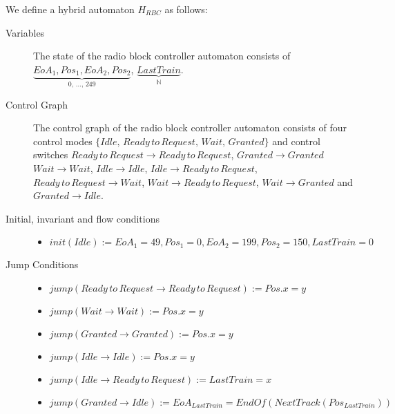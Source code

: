 \begin{mydef}

We define a hybrid automaton $H_{RBC}$ as follows:
\begin{description}
\item[Variables] The state of the radio block controller automaton consists of $\underbrace{EoA_1, Pos_1, EoA_2, Pos_2}_\text{0, \ldots , 249}$, \newline $\underbrace{LastTrain}_{\mathbb{N}}$.

\item[Control Graph] The control graph of the radio block controller automaton consists of four control modes $\{Idle, \, Ready \, to \, Request, \, Wait, \, Granted \}$ and control switches $Ready \, to \, Request \to Ready \, to \, Request$, $Granted \to Granted$ $Wait \to Wait$, $Idle \to Idle$, $Idle \to Ready \, to \, Request$, $Ready \, to \, Request \to Wait$, $Wait \to Ready \, to \, Request$, $Wait \to Granted$ and $Granted \to Idle$.

\item[Initial, invariant and flow conditions] \hspace*{0mm}
	\begin{itemize}
	\item $init(Idle) :=   EoA_1 = 49, Pos_1 = 0, EoA_2 = 199, Pos_2 = 150, LastTrain = 0 $
	\end{itemize}

\item[Jump Conditions] \hspace*{0mm}

	\begin{itemize}
	\item $jump(Ready \, to \, Request \to Ready \, to \, Request) :=  Pos.x = y$
	\item $jump(Wait \to Wait) :=  Pos.x = y$
	\item $jump(Granted \to Granted) :=  Pos.x = y$
	\item $jump(Idle \to Idle) := Pos.x = y$
	\item $jump(Idle \to Ready \, to \, Request) := LastTrain = x$
	\item $jump(Granted \to Idle) := EoA_{LastTrain} = EndOf(NextTrack(Pos_{LastTrain}))$
	\end{itemize}


\end{description}
\end{mydef}
